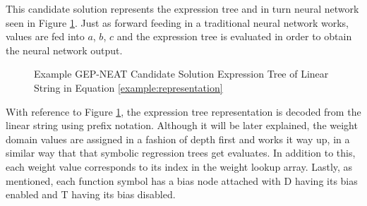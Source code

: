 \noindent This candidate solution represents the expression tree and in turn neural network seen in Figure \ref{fig:gep_neat_representation_example_tree}. Just as forward feeding in a traditional neural network works, values are fed into $a$, $b$, $c$ and the expression tree is evaluated in order to obtain the neural network output.

\begin{figure}[H] %
	\centering %
	\caption{Example GEP-NEAT Candidate Solution Expression Tree of Linear String in Equation \ref{example:representation}}
	\label{fig:gep_neat_representation_example_tree} %
\end{figure}

\noindent With reference to Figure \ref{fig:gep_neat_representation_example_tree}, the expression tree representation is decoded from the linear string using prefix notation. Although it will be later explained, the weight domain values are assigned in a fashion of depth first and works it way up, in a similar way that that symbolic regression trees get evaluates. In addition to this, each weight value corresponds to its index in the weight lookup array. Lastly, as mentioned, each function symbol has a bias node attached with D having its bias enabled and T having its bias disabled. \bigskip

